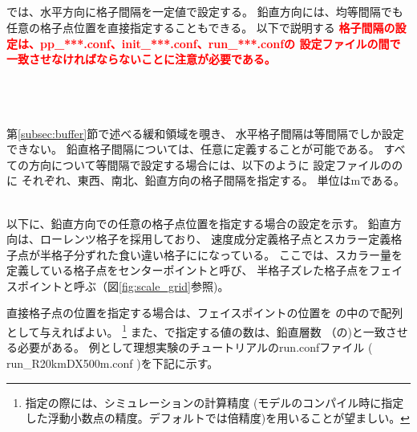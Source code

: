 \subsection{\SubsecGridIntvSettng} \label{subsec:gridinterv}
\scalerm では、水平方向に格子間隔を一定値で設定する。
鉛直方向には、均等間隔でも任意の格子点位置を直接指定することもできる。
以下で説明する
\textcolor{red}{\bf 格子間隔の設定は、pp\_***.conf、init\_***.conf、run\_***.confの
設定ファイルの間で一致させなければならないことに注意が必要である。}

~\\
\\
~\\

第\ref{subsec:buffer}節で述べる緩和領域を覗き、
水平格子間隔は等間隔でしか設定できない。
鉛直格子間隔については、任意に定義することが可能である。
すべての方向について等間隔で設定する場合には、以下のように
設定ファイルののに
それぞれ、東西、南北、鉛直方向の格子間隔を指定する。
単位はmである。

\\


以下に、鉛直方向での任意の格子点位置を指定する場合の設定を示す。
鉛直方向は、ローレンツ格子を採用しており、
速度成分定義格子点とスカラー定義格子点が半格子分ずれた食い違い格子にになっている。
ここでは、スカラー量を定義している格子点をセンターポイントと呼び、
半格子ズレた格子点をフェイスポイントと呼ぶ（図\ref{fig:scale_grid}参照)。

直接格子点の位置を指定する場合は、フェイスポイントの位置を
の中ので配列として与えればよい。
\footnote{指定の際には、シミュレーションの計算精度
(モデルのコンパイル時に指定した浮動小数点の精度。デフォルトでは倍精度)を用いることが望ましい。}
また、で指定する値の数は、鉛直層数
（の)と一致させる必要がある。
例として理想実験のチュートリアルのrun.confファイル
( run\_R20kmDX500m.conf )を下記に示す。

